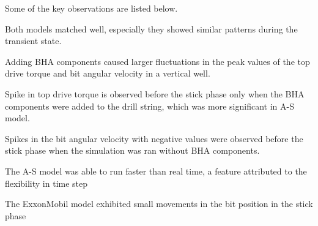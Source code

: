 Some of the key observations are listed below.
\begin{bulletedlist}
    \item Both models matched well, especially they showed similar patterns during the transient state. 
    \item Adding BHA components caused larger fluctuations in the peak values of the top drive torque and bit angular velocity in a vertical well.
    \item Spike in top drive torque is observed before the stick phase only when the BHA components were added to the drill string, which was more significant in A-S model. 
    \item Spikes in the bit angular velocity with negative values were observed before the stick phase when the simulation was ran without BHA components. 
    \item The A-S model was able to run faster than real time, a feature attributed to the flexibility in time step
    \item The ExxonMobil model exhibited small movements in the bit position in the stick phase
\end{bulletedlist}
